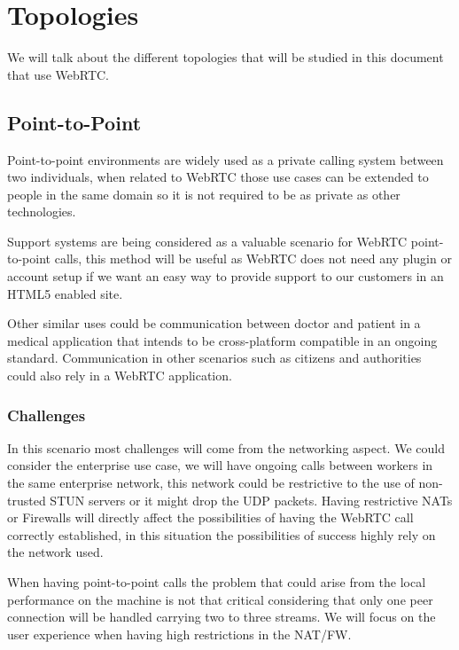 \section{Topologies}
\label{sec:topologies}


\thispagestyle{empty}

We will talk about the different topologies that will be studied in this document that use WebRTC.

\subsection{Point-to-Point}

Point-to-point environments are widely used as a private calling system between two individuals, when related to WebRTC those use cases can be extended to people in the same domain so it is not required to be as private as other technologies. 

Support systems are being considered as a valuable scenario for WebRTC point-to-point calls, this method will be useful as WebRTC does not need any plugin or account setup if we want an easy way to provide support to our customers in an HTML5 enabled site.

Other similar uses could be communication between doctor and patient in a medical application that intends to be cross-platform compatible in an ongoing standard. Communication in other scenarios such as citizens and authorities could also rely in a WebRTC application.
 
\subsubsection{Challenges}

In this scenario most challenges will come from the networking aspect. We could consider the enterprise use case, we will have ongoing calls between workers in the same enterprise network, this network could be restrictive to the use of non-trusted STUN servers or it might drop the UDP packets. Having restrictive NATs or Firewalls will directly affect the possibilities of having the WebRTC call correctly established, in this situation the possibilities of success highly rely on the network used.

When having point-to-point calls the problem that could arise from the local performance on the machine is not that critical considering that only one peer connection will be handled carrying two to three streams. We will focus on the user experience when having high restrictions in the NAT/FW.

